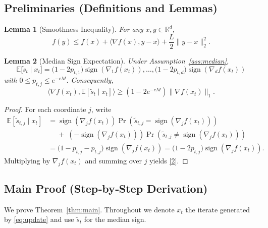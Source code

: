 \documentclass{article}
\newtheorem{lemma}{Lemma}
\newcommand{\sign}{\operatorname{sign}}
\newcommand{\E}{\mathbb{E}}
\newcommand{\R}{\mathbb{R}}
\begin{document}
\subsection*{Preliminaries (Definitions and Lemmas)}
\begin{lemma}[Smoothness Inequality]\label{lem:smooth}
For any $x,y\in\R^{d}$,
\[
f(y)\le f(x)+\langle\nabla f(x),y-x\rangle+\frac{L}{2}\|y-x\|_{2}^{2}.
\]
\end{lemma}
\begin{lemma}[Median Sign Expectation]\label{lem:median}
Under Assumption~\ref{ass:median},
\[
\E\big[\tilde{s}_{t}\mid x_{t}\big]
      =\big(1-2p_{t,1}\big)\sign(\nabla_{1}f(x_{t})),\dots,
        \big(1-2p_{t,d}\big)\sign(\nabla_{d}f(x_{t}))
\]
with $0\le p_{t,j}\le e^{-cM}$.
Consequently,
\[
\langle\nabla f(x_{t}),\E[\tilde{s}_{t}\mid x_{t}]\rangle
   \ge (1-2e^{-cM})\|\nabla f(x_{t})\|_{1}.
\tag{2}
\]
\end{lemma}
\begin{proof}
For each coordinate $j$, write
\[
\begin{aligned}
\E[\tilde{s}_{t,j}\mid x_{t}]
 &=\sign(\nabla_{j}f(x_{t}))\Pr(\tilde{s}_{t,j}=\sign(\nabla_{j}f(x_{t}))) \\
 &\quad\;+\;(-\sign(\nabla_{j}f(x_{t})))\Pr(\tilde{s}_{t,j}\neq\sign(\nabla_{j}f(x_{t})))\\
 &=\big(1-p_{t,j}-p_{t,j}\big)\sign(\nabla_{j}f(x_{t}))
   =\big(1-2p_{t,j}\big)\sign(\nabla_{j}f(x_{t})).
\end{aligned}
\]
Multiplying by $\nabla_{j}f(x_{t})$ and summing over $j$ yields \eqref{2}.
\end{proof}

\subsection*{Main Proof (Step‑by‑Step Derivation)}
We prove Theorem~\ref{thm:main}.  Throughout we denote $x_{t}$ the iterate
generated by \eqref{eq:update} and use $\tilde{s}_{t}$ for the median sign.
\end{document}
